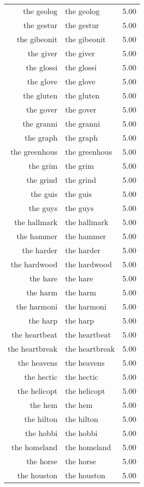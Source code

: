 \begin{table}[ht]
\begin{tabular}{rlr}
  the geolog & the geolog & 5.00 \\ 
  the gestur & the gestur & 5.00 \\ 
  the gibeonit & the gibeonit & 5.00 \\ 
  the giver & the giver & 5.00 \\ 
  the glossi & the glossi & 5.00 \\ 
  the glove & the glove & 5.00 \\ 
  the gluten & the gluten & 5.00 \\ 
  the gover & the gover & 5.00 \\ 
  the granni & the granni & 5.00 \\ 
  the graph & the graph & 5.00 \\ 
  the greenhous & the greenhous & 5.00 \\ 
  the grim & the grim & 5.00 \\ 
  the grind & the grind & 5.00 \\ 
  the guis & the guis & 5.00 \\ 
  the guys & the guys & 5.00 \\ 
  the hallmark & the hallmark & 5.00 \\ 
  the hammer & the hammer & 5.00 \\ 
  the harder & the harder & 5.00 \\ 
  the hardwood & the hardwood & 5.00 \\ 
  the hare & the hare & 5.00 \\ 
  the harm & the harm & 5.00 \\ 
  the harmoni & the harmoni & 5.00 \\ 
  the harp & the harp & 5.00 \\ 
  the heartbeat & the heartbeat & 5.00 \\ 
  the heartbreak & the heartbreak & 5.00 \\ 
  the heavens & the heavens & 5.00 \\ 
  the hectic & the hectic & 5.00 \\ 
  the helicopt & the helicopt & 5.00 \\ 
  the hem & the hem & 5.00 \\ 
  the hilton & the hilton & 5.00 \\ 
  the hobbi & the hobbi & 5.00 \\ 
  the homeland & the homeland & 5.00 \\ 
  the horse & the horse & 5.00 \\ 
  the houston & the houston & 5.00 \\ 

\end{tabular}
\end{table}
